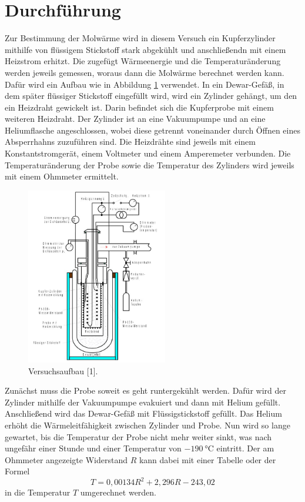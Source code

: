 \section{Durchführung}
\label{sec:Durchführung}
Zur Bestimmung der Molwärme wird in diesem Versuch ein Kupferzylinder mithilfe 
von flüssigem Stickstoff stark abgekühlt und anschließendn mit einem Heizstrom erhitzt. 
Die zugefügt Wärmeenergie und die Temperaturänderung werden jeweils gemessen, 
woraus dann die Molwärme berechnet werden kann. 
\\

Dafür wird ein Aufbau wie in Abbildung \ref{fig:aufbau} verwendet. 
In ein Dewar-Gefäß, in dem später flüssiger Stickstoff eingefüllt wird,
wird ein Zylinder gehängt, um den ein Heizdraht gewickelt ist. 
Darin befindet sich die Kupferprobe mit einem weiteren Heizdraht. 
Der Zylinder ist an eine Vakuumpumpe und an eine Heliumflasche angeschlossen, wobei diese 
getrennt voneinander durch Öffnen eines Absperrhahns zuzuführen sind.
Die Heizdrähte sind jeweils mit einem Konstantstromgerät, einem Voltmeter und einem Amperemeter
verbunden. Die Temperaturänderung der Probe sowie die Temperatur des Zylinders wird jeweils mit einem Ohmmeter ermittelt.
\FloatBarrier
\begin{figure}
  \centering
  \includegraphics[width=0.55\textwidth]{Aufbau.JPG}
  \caption{Versuchsaufbau [1].}
  \label{fig:aufbau}
\end{figure}
\FloatBarrier

Zunächst muss die Probe soweit es geht runtergekühlt werden. Dafür wird der Zylinder mithilfe der Vakuumpumpe evakuiert und dann 
mit Helium gefüllt. Anschließend wird das Dewar-Gefäß mit Flüssigstickstoff gefüllt. Das Helium erhöht die Wärmeleitfähigkeit 
zwischen Zylinder und Probe. Nun wird so lange gewartet, bis die Temperatur der Probe nicht mehr weiter sinkt, 
was nach ungefähr einer Stunde und einer Temperatur von $\SI{-190}{\celsius}$ eintritt. 
Der am Ohmmeter angezeigte Widerstand $R$ kann dabei mit einer Tabelle oder der Formel 
\begin{equation}
    \label{eqn:T}
    T = 0,00134 R^2 + 2,296 R -243,02
\end{equation}
in die Temperatur $T$ umgerechnet werden.
\\

